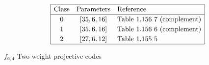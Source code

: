 \documentclass[12pt,a4paper]{article}
\begin{document}
\begin{table}[!bhpt] %
\begin{align*}
\def\arraystretch{1.2}
\begin{array}{|ccl|}
\hline
\text{Class} &
\text{Parameters} & \text{Reference}
\\
\hline
0 & [35,6,16] & \text{Table 1.156 7 (complement)}
\\
1 & [35,6,16] & \text{Table 1.156 6 (complement)}
\\
2 & [27,6,12] & \text{Table 1.155 5 }
\\
\hline
\end{array}
\end{align*}
\caption{$f_{6,4}$ Two-weight projective codes}
\label{tab-c6_4_codes}
\end{table}

\end{document}
